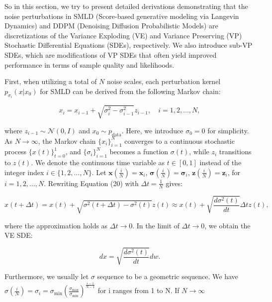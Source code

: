 So in this section, we try to present detailed derivations demonstrating that the noise perturbations in SMLD (Score-based generative modeling via Langevin Dynamics) and DDPM (Denoising Diffusion Probabilistic Models) are discretizations of the Variance Exploding (VE) and Variance Preserving (VP) Stochastic Differential Equations (SDEs), respectively. We also introduce sub-VP SDEs, which are modifications of VP SDEs that often yield improved performance in terms of sample quality and likelihoods.

First, when utilizing a total of \( N \) noise scales, each perturbation kernel \( p_{\sigma_i}(x | x_0) \) for SMLD can be derived from the following Markov chain:

\begin{equation}
x_i = x_{i-1} + \sqrt{\sigma_i^2 - \sigma_{i-1}^2} z_{i-1}, \quad i = 1, 2, \ldots, N,
\end{equation}

\noindent
where \( z_{i-1} \sim \mathcal{N}(0, I) \) and \( x_0 \sim p_{\text{data}} \). Here, we introduce \( \sigma_0 = 0 \) for simplicity. As \( N \to \infty \), the Markov chain \( \{ x_i \}_{i=1}^N \) converges to a continuous stochastic process \( \{ x(t) \}_{t=0}^1 \), and \( \{ \sigma_i \}_{i=1}^N \) becomes a function \( \sigma(t) \), while \( z_i \) transitions to \( z(t) \). We denote the continuous time variable as \( t \in [0, 1] \) instead of the integer index \( i \in \{ 1, 2, \ldots, N \} \). Let $\mathbf{x} ( \frac{i}{N} ) = \mathbf{x}_i$, $\mathbf{\sigma} ( \frac{i}{N} ) = \mathbf{\sigma}_i$, $\mathbf{z} ( \frac{i}{N} ) = \mathbf{z}_i$, for $i = 1, 2, \ldots, N$. 
Rewriting Equation (20) with $\Delta t = \frac{1}{N}$ gives:
 
\begin{equation}
x(t + \Delta t) = x(t) + \sqrt{\sigma^2(t + \Delta t) - \sigma^2(t)} z(t) \approx x(t) + \sqrt{\frac{d \sigma^2(t)}{dt}} \Delta t z(t),
\end{equation}

\noindent
where the approximation holds as \( \Delta t \to 0 \). In the limit of \( \Delta t \to 0 \), we obtain the VE SDE:

\begin{equation}
dx = \sqrt{\frac{d \sigma^2(t)}{dt}} dw.
\end{equation}

\noindent
Furthermore, we usually let $\sigma$ sequence to be a geometric sequence. We have $\sigma (\frac{i}{N}) = \sigma_i = \sigma_{\min} (\frac{\sigma_{\max}}{\sigma_{\min}})^{\frac{i-1}{N-1}}$ for i ranges from 1 to N. If \( N \to \infty \)

